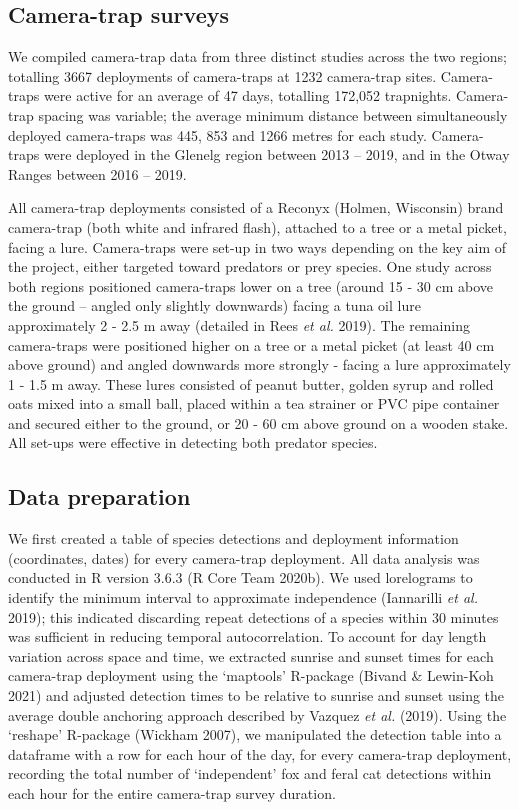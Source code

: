 \documentclass[11pt,a4paper,titlepage,twoside,openright]{style/unimelbthesis}
\begin{document}
\begin{mainmatter}
\hypertarget{camera-trap-surveys-1}{%
\subsection{Camera-trap surveys}\label{camera-trap-surveys-1}}

We compiled camera-trap data from three distinct studies across the two regions; totalling 3667 deployments of camera-traps at 1232 camera-trap sites. Camera-traps were active for an average of 47 days, totalling 172,052 trapnights. Camera-trap spacing was variable; the average minimum distance between simultaneously deployed camera-traps was 445, 853 and 1266 metres for each study. Camera-traps were deployed in the Glenelg region between 2013 -- 2019, and in the Otway Ranges between 2016 -- 2019.

All camera-trap deployments consisted of a Reconyx (Holmen, Wisconsin) brand camera-trap (both white and infrared flash), attached to a tree or a metal picket, facing a lure. Camera-traps were set-up in two ways depending on the key aim of the project, either targeted toward predators or prey species. One study across both regions positioned camera-traps lower on a tree (around 15 - 30 cm above the ground -- angled only slightly downwards) facing a tuna oil lure approximately 2 - 2.5 m away (detailed in Rees \emph{et al.} 2019). The remaining camera-traps were positioned higher on a tree or a metal picket (at least 40 cm above ground) and angled downwards more strongly - facing a lure approximately 1 - 1.5 m away. These lures consisted of peanut butter, golden syrup and rolled oats mixed into a small ball, placed within a tea strainer or PVC pipe container and secured either to the ground, or 20 - 60 cm above ground on a wooden stake. All set-ups were effective in detecting both predator species.

\hypertarget{data-preparation}{%
\subsection{Data preparation}\label{data-preparation}}

We first created a table of species detections and deployment information (coordinates, dates) for every camera-trap deployment. All data analysis was conducted in R version 3.6.3 (R Core Team 2020b). We used lorelograms to identify the minimum interval to approximate independence (Iannarilli \emph{et al.} 2019); this indicated discarding repeat detections of a species within 30 minutes was sufficient in reducing temporal autocorrelation. To account for day length variation across space and time, we extracted sunrise and sunset times for each camera-trap deployment using the `maptools' R-package (Bivand \& Lewin-Koh 2021) and adjusted detection times to be relative to sunrise and sunset using the average double anchoring approach described by Vazquez \emph{et al.} (2019). Using the `reshape' R-package (Wickham 2007), we manipulated the detection table into a dataframe with a row for each hour of the day, for every camera-trap deployment, recording the total number of `independent' fox and feral cat detections within each hour for the entire camera-trap survey duration.


\end{mainmatter}
\end{document}
